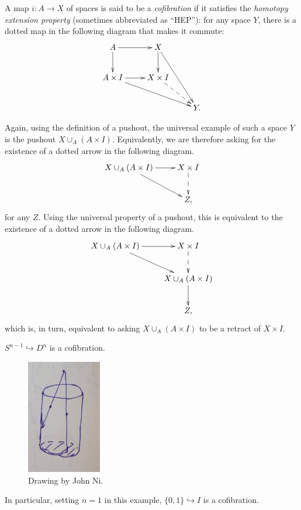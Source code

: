 \begin{definition}\label{cofibration}
    A map $i:A\to X$ of spaces is said to be a \emph{cofibration} if it satisfies the
    \emph{homotopy extension property} (sometimes abbreviated as ``HEP''):
    for any space $Y$, there is a dotted map in the following diagram that makes it commute:
    \begin{equation*}
    \xymatrix{
	A\ar[r]\ar[d] & X\ar[d]\ar[ddr] & \\
	A\times I\ar[r]\ar[drr] & X\times I\ar@{-->}[dr] & \\
	& & Y.
    }
    \end{equation*}
\end{definition}

Again, using the definition of a pushout, the universal example of such a space $Y$ is the pushout $X\cup_A (A\times I)$.
Equivalently, we are therefore asking for the existence of a dotted arrow in the following diagram.
\begin{equation*}
    \xymatrix{
	X\cup_A (A\times I)\ar[r]\ar[dr] & X\times I\ar@{-->}[d]\\
	& Z,
    }
\end{equation*}
for any $Z$.
Using the universal property of a pushout, this is equivalent to the existence of a dotted arrow in the following diagram.
\begin{equation*}
    \xymatrix{
	X\cup_A (A\times I)\ar[r]\ar[dr] & X\times I\ar@{-->}[d]\\
	& X\cup_A(A\times I)\ar[d]\\
	& Z,
    }
\end{equation*}
which is, in turn, equivalent to asking $X\cup_A (A\times I)$ to be a retract of $X\times I$.

\begin{example}
    $S^{n-1}\hookrightarrow D^n$ is a cofibration.
    \begin{figure}[H]
	\centering
	\includegraphics[scale=0.75]{assets/retract-cofibration}
	\caption{Drawing by John Ni.}
    \end{figure}
    In particular, setting $n=1$ in this example, $\{0,1\}\hookrightarrow I$ is a cofibration.
\end{example}

